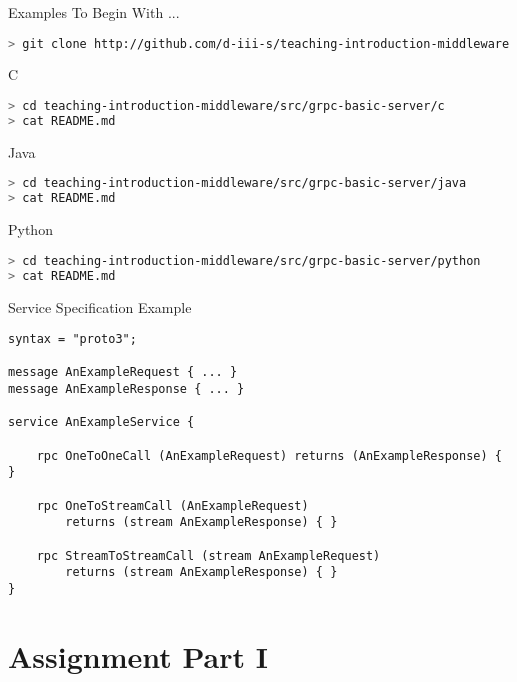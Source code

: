 \begin{frame}[fragile]{Examples To Begin With ...}
\begin{lstlisting}[language=bash,style=mini]
> git clone http://github.com/d-iii-s/teaching-introduction-middleware.git
\end{lstlisting}
    \begin{block}{C}
\begin{lstlisting}[language=bash,style=mini]
> cd teaching-introduction-middleware/src/grpc-basic-server/c
> cat README.md
\end{lstlisting}
    \end{block}
    \begin{block}{Java}
\begin{lstlisting}[language=bash,style=mini]
> cd teaching-introduction-middleware/src/grpc-basic-server/java
> cat README.md
\end{lstlisting}
    \end{block}
    \begin{block}{Python}
\begin{lstlisting}[language=bash,style=mini]
> cd teaching-introduction-middleware/src/grpc-basic-server/python
> cat README.md
\end{lstlisting}
    \end{block}
\end{frame}


\begin{frame}[fragile]{Service Specification Example}
\begin{lstlisting}[style=mini]
syntax = "proto3";

message AnExampleRequest { ... }
message AnExampleResponse { ... }

service AnExampleService {

    rpc OneToOneCall (AnExampleRequest) returns (AnExampleResponse) { }

    rpc OneToStreamCall (AnExampleRequest)
        returns (stream AnExampleResponse) { }

    rpc StreamToStreamCall (stream AnExampleRequest)
        returns (stream AnExampleResponse) { }
}
\end{lstlisting}
\end{frame}


\section{Assignment Part I}


